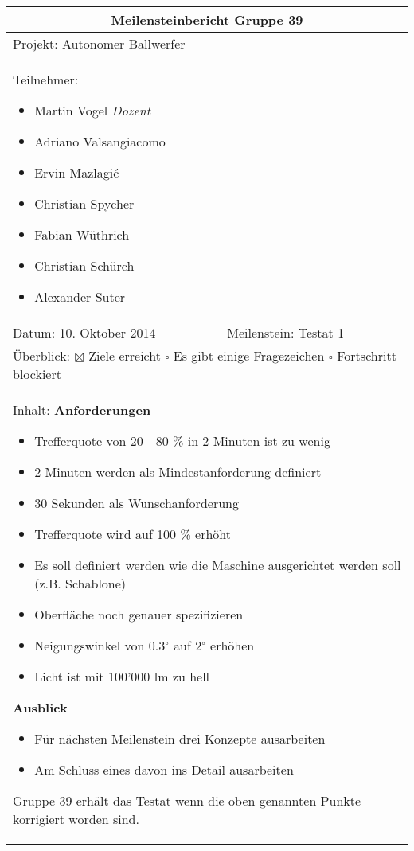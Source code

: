 \begin{table}[!h]
	\renewcommand{\arraystretch}{1.5}
	\begin{tabularx}{\textwidth}{|X|X|}
		\hline
		\multicolumn{2}{|c|}{
			\parbox[0pt][3em][c]{0cm}{}
			{\large \textbf{Meilensteinbericht Gruppe 39}}
		} \\
		\hline
		\multicolumn{2}{|l|}{Projekt: Autonomer Ballwerfer} \\
		\hline
		\multicolumn{2}{|p{0.95\textwidth}|}{
			Teilnehmer:
			\begin{itemize}
				\setlength\itemsep{0em}
				\item Martin Vogel \textit{Dozent}
				\item Adriano Valsangiacomo
				\item Ervin Mazlagi\'c
				\item Christian Spycher
				\item Fabian Wüthrich
				\item Christian Schürch
				\item Alexander Suter
			\end{itemize}
		} \\
		\hline
		Datum: 10. Oktober 2014 & Meilenstein: Testat 1 \\
		\hline
		\multicolumn{2}{|p{0.95\textwidth}|}{
			Überblick: \newline
			$\boxtimes$ Ziele erreicht \newline 
			$\square$ Es gibt einige Fragezeichen \newline
			$\square$ Fortschritt blockiert
		} \\
		\hline
		\multicolumn{2}{|p{0.95\textwidth}|}{
			Inhalt: \newline
			\textbf{Anforderungen}
			\begin{itemize}
				\item Trefferquote von 20 - 80 \% in 2 Minuten ist zu wenig
				\item 2 Minuten werden als Mindestanforderung definiert
				\item 30 Sekunden als Wunschanforderung
				\item Trefferquote wird auf 100 \% erhöht
				\item Es soll definiert werden wie die Maschine ausgerichtet werden soll (z.B. Schablone)
				\item Oberfläche noch genauer spezifizieren
				\item Neigungswinkel von 0.3$^\circ$ auf 2$^\circ$ erhöhen
				\item Licht ist mit 100'000 lm zu hell
			\end{itemize}
			\textbf{Ausblick}
			\begin{itemize}
				\item Für nächsten Meilenstein drei Konzepte ausarbeiten
				\item Am Schluss eines davon ins Detail ausarbeiten
			\end{itemize}
			Gruppe 39 erhält das Testat wenn die oben genannten Punkte korrigiert worden sind.
		} \\
		\hline
	\end{tabularx}
\end{table}
